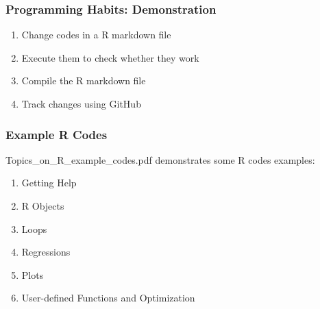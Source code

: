 \documentclass[aspectratio=169, 12pt]{beamer}
\begin{document}
\begin{frame}
\begin{figure}
	\end{figure}

	\end{frame}

	\begin{frame}
	\frametitle{Programming Habits: Demonstration}
	\begin{enumerate}
	\item Change codes in a R markdown file
	\item Execute them to check whether they work
	\item Compile the R markdown file
	\item Track changes using GitHub
	\end{enumerate}

	\end{frame}

	\begin{frame}
	\frametitle{Example R Codes}
	Topics\_on\_R\_example\_codes.pdf demonstrates some R codes examples:
	\begin{enumerate}
	\item Getting Help
	\item R Objects
	\item Loops
	\item Regressions
	\item Plots
	\item User-defined Functions and Optimization
	\end{enumerate}

	\end{frame}
\end{document}
